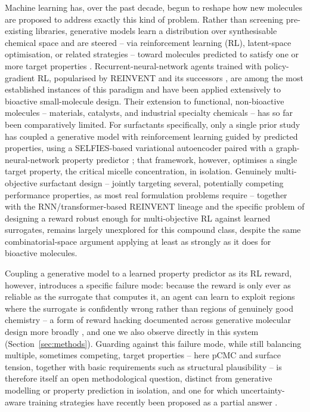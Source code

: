 \documentclass[11pt]{aime}
\begin{document}
Machine learning has, over the past decade, begun to reshape how new molecules are proposed to address exactly this kind of problem. Rather than screening pre-existing libraries, generative models learn a distribution over synthesisable chemical space and are steered -- via reinforcement learning (RL), latent-space optimisation, or related strategies -- toward molecules predicted to satisfy one or more target properties \cite{sanchez-lengeling_inverse_2018,ozcelik_generative_2025}. Recurrent-neural-network agents trained with policy-gradient RL, popularised by REINVENT \cite{olivecrona_molecular_2017} and its successors \cite{blaschke_memory-assisted_2020,loeffler_reinvent_2024}, are among the most established instances of this paradigm and have been applied extensively to bioactive small-molecule design. Their extension to functional, non-bioactive molecules -- materials, catalysts, and industrial specialty chemicals -- has so far been comparatively limited. For surfactants specifically, only a single prior study has coupled a generative model with reinforcement learning guided by predicted properties, using a SELFIES-based variational autoencoder paired with a graph-neural-network property predictor \cite{nnadili_surfactant-specific_2024}; that framework, however, optimises a single target property, the critical micelle concentration, in isolation. Genuinely multi-objective surfactant design -- jointly targeting several, potentially competing performance properties, as most real formulation problems require -- together with the RNN/transformer-based REINVENT lineage and the specific problem of designing a reward robust enough for multi-objective RL against learned surrogates, remains largely unexplored for this compound class, despite the same combinatorial-space argument applying at least as strongly as it does for bioactive molecules.

Coupling a generative model to a learned property predictor as its RL reward, however, introduces a specific failure mode: because the reward is only ever as reliable as the surrogate that computes it, an agent can learn to exploit regions where the surrogate is confidently wrong rather than regions of genuinely good chemistry -- a form of reward hacking documented across generative molecular design more broadly \cite{yoshizawa_datadriven_2025}, and one we also observe directly in this system (Section~\ref{sec:methods}). Guarding against this failure mode, while still balancing multiple, sometimes competing, target properties -- here pCMC and surface tension, together with basic requirements such as structural plausibility -- is therefore itself an open methodological question, distinct from generative modelling or property prediction in isolation, and one for which uncertainty-aware training strategies have recently been proposed as a partial answer \cite{medina_uncertainty_2026}.
\end{document}
